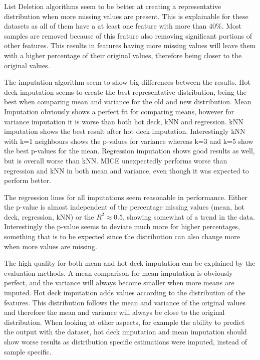 \documentclass[10pt,a4paper]{article}
\begin{document}
	List Deletion algorithms seem to be better at creating a representative distribution when more missing values are present. This is explainable for these datasets as all of them have a at least one feature with more than 40\%. Most samples are removed because of this feature also removing significant portions of other features. This results in features having more missing values will leave them with a higher percentage of their original values, therefore being closer to the original values.
	
	The imputation algorithm seem to show big differences between the results. Hot deck imputation seems to create the best representative distribution, being the best when comparing mean and variance for the old and new distribution. Mean Imputation obviously shows a perfect fit for comparing means, however for variance imputation it is worse than both hot deck, kNN and regression. kNN imputation shows the best result after hot deck imputation. Interestingly kNN with k=1 neighbours shows the p-values for variance whereas k=3 and k=5 show the best p-values for the mean. Regression imputation shows good results as well, but is overall worse than kNN. MICE unexpectedly performs worse than regression and kNN in both mean and variance, even though it was expected to perform better.
	
	The regression lines for all imputations seem reasonable in performance. Either the p-value is almost independent of the percentage missing values (mean, hot deck, regression, kNN) or the $R^2 \approx 0.5$, showing somewhat of a trend in the data. Interestingly the p-value seems to deviate much more for higher percentages, something that is to be expected since the distribution can also change more when more values are missing.  
	
	The high quality for both mean and hot deck imputation can be explained by the evaluation methods. A mean comparison for mean imputation is obviously perfect, and the variance will always become smaller when more means are imputed. Hot deck imputation adds values according to the distribution of the features. This distribution follows the mean and variance of the original values and therefore the mean and variance will always be close to the original distribution. When looking at other aspects, for example the ability to predict the output with the dataset, hot deck imputation and mean imputation should show worse results as distribution specific estimations were imputed, instead of sample specific.
	
\end{document}
